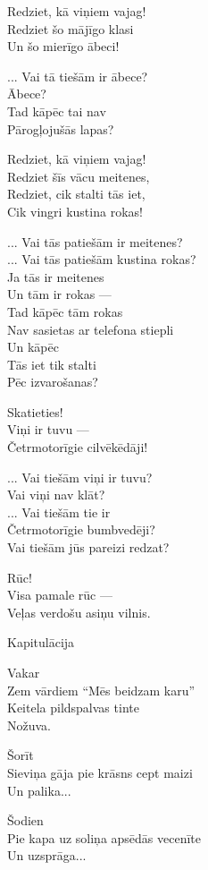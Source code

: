 \documentclass[14pt]{extarticle}
\begin{document}
Redziet, kā viņiem vajag!\\
Redziet šo mājīgo klasi\\
Un šo mierīgo ābeci!

... Vai tā tiešām ir ābece?\\
Ābece?\\
Tad kāpēc tai nav\\
Pārogļojušās lapas?

Redziet, kā viņiem vajag!\\
Redziet šīs vācu meitenes,\\
Redziet, cik stalti tās iet,\\
Cik vingri kustina rokas!

... Vai tās patiešām ir meitenes?\\
... Vai tās patiešām kustina rokas?\\
Ja tās ir meitenes\\
Un tām ir rokas ---\\
Tad kāpēc tām rokas\\
Nav sasietas ar telefona stiepli\\
Un kāpēc\\
Tās iet tik stalti\\
Pēc izvarošanas?

Skatieties!\\
Viņi ir tuvu ---\\
Četrmotorīgie cilvēkēdāji!

... Vai tiešām viņi ir tuvu?\\
Vai viņi nav klāt?\\
... Vai tiešām tie ir\\
Četrmotorīgie bumbvedēji?\\
Vai tiešām jūs pareizi redzat?

Rūc!\\
Visa pamale rūc ---\\
Veļas verdošu asiņu vilnis.



\newpage

{\large \sc Kapitulācija}

Vakar\\
Zem vārdiem ``Mēs beidzam karu''\\
Keitela pildspalvas tinte\\
Nožuva.

Šorīt\\
Sieviņa gāja pie krāsns cept maizi\\
Un palika...

Šodien\\
Pie kapa uz soliņa apsēdās vecenīte\\
Un uzsprāga...
\end{document}

